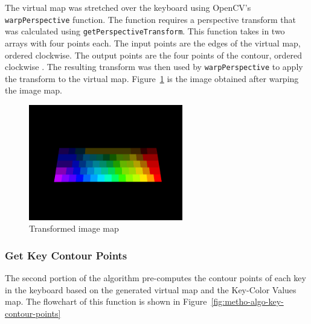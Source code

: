 \documentclass{report}
\begin{document}
The virtual map was stretched over the keyboard using OpenCV's
\texttt{warpPerspective} function. The function requires a perspective transform
that was calculated using \texttt{getPerspectiveTransform}. This function takes
in two arrays with four points each. The input points are the edges of the
virtual map, ordered clockwise. The output points are the four points of the
contour, ordered clockwise \parencite{opencv-image-transform}. The resulting
transform was then used by \texttt{warpPerspective} to apply the transform to
the virtual map. Figure~\ref{fig:metho-algo-transform} is the image obtained
after warping the image map.

\begin{figure}[H]
	\centering
	\includegraphics[width=0.6\textwidth]{transformed-image-map.png}
	\caption{Transformed image map}
	\label{fig:metho-algo-transform}
	\centering
\end{figure}

\subsubsection{Get Key Contour Points}
The second portion of the algorithm pre-computes the contour points of each key
in the keyboard based on the generated virtual map and the Key-Color Values map.
The flowchart of this function is shown in
Figure~\ref{fig:metho-algo-key-contour-points}
\end{document}
